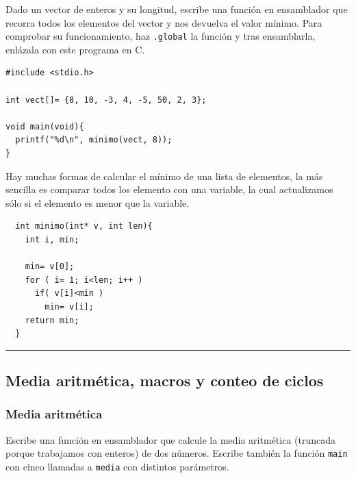 Dado un vector de enteros y su longitud, escribe una función en ensamblador
que recorra todos los elementos del vector y nos devuelva el valor mínimo.
Para comprobar su funcionamiento, haz {\tt .global} la función y tras ensamblarla,
enlázala con este programa en C.

\begin{lstlisting}
#include <stdio.h>

int vect[]= {8, 10, -3, 4, -5, 50, 2, 3};

void main(void){
  printf("%d\n", minimo(vect, 8));
}
\end{lstlisting}

Hay muchas formas de calcular el mínimo de una lista de elementos, la más sencilla es
comparar todos los elemento con una variable, la cual actualizamos sólo si el elemento es
menor que la variable.

\begin{center}
\begin{myfbox}
\small
\begin{minipage}{0.92\linewidth}
\begin{center}
\begin{minipage}{0.6\linewidth}
\begin{verbatim}
  int minimo(int* v, int len){
    int i, min;

    min= v[0];
    for ( i= 1; i<len; i++ )
      if( v[i]<min )
        min= v[i];
    return min;
  }
\end{verbatim}
\end{minipage}
\end{center}
\begin{center}
\colorbox[gray]{1}{\rule{0cm}{7cm}\rule{11cm}{0cm}}
\end{center}
\end{minipage}
\end{myfbox}
\end{center}

\subsection{Media aritmética, macros y conteo de ciclos}

\subsubsection{Media aritmética}

Escribe una función en ensamblador que calcule la media aritmética (truncada porque
trabajamos con enteros) de dos números. Escribe también la función {\tt main} con 
cinco llamadas a {\tt media} con distintos parámetros.

